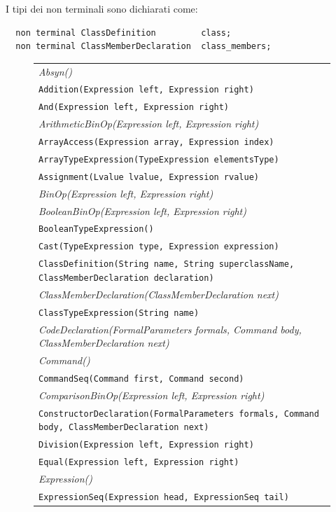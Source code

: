 I tipi dei non terminali sono dichiarati come:
%
\begin{verbatim}
  non terminal ClassDefinition         class;
  non terminal ClassMemberDeclaration  class_members;
\end{verbatim}
%
\begin{figure}
\begin{center}
{\scriptsize
\begin{tabular}{l}
\textit{Absyn()} \\
\texttt{Addition(Expression left, Expression right)} \\
\texttt{And(Expression left, Expression right)} \\
\textit{ArithmeticBinOp(Expression left, Expression right)} \\
\texttt{ArrayAccess(Expression array, Expression index)} \\
\texttt{ArrayTypeExpression(TypeExpression elementsType)} \\
\texttt{Assignment(Lvalue lvalue, Expression rvalue)} \\
\textit{BinOp(Expression left, Expression right)} \\
\textit{BooleanBinOp(Expression left, Expression right)} \\
\texttt{BooleanTypeExpression()} \\
\texttt{Cast(TypeExpression type, Expression expression)} \\
\texttt{ClassDefinition(String name, String superclassName, ClassMemberDeclaration declaration)} \\
\textit{ClassMemberDeclaration(ClassMemberDeclaration next)} \\
\texttt{ClassTypeExpression(String name)} \\
\textit{CodeDeclaration(FormalParameters formals, Command body, ClassMemberDeclaration next)} \\
\textit{Command()} \\
\texttt{CommandSeq(Command first, Command second)} \\
\textit{ComparisonBinOp(Expression left, Expression right)} \\
\texttt{ConstructorDeclaration(FormalParameters formals, Command body, ClassMemberDeclaration next)} \\
\texttt{Division(Expression left, Expression right)} \\
\texttt{Equal(Expression left, Expression right)} \\
\textit{Expression()} \\
\texttt{ExpressionSeq(Expression head, ExpressionSeq tail)} \\

\end{tabular}}
\end{center}
\end{figure}
